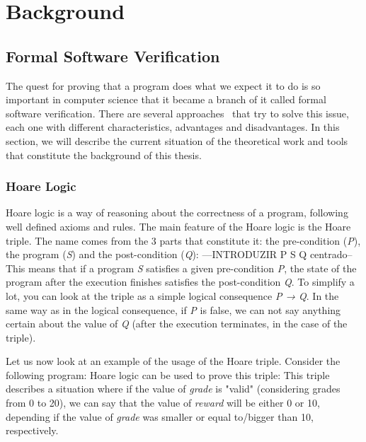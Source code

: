 
%

\chapter{Background}
\label{cha:background}

\glsresetall


\section{Formal Software Verification}
\label{sec:formal_software_verification}

The quest for proving that a program does what we expect it to do is so important in computer science that it became a branch of it called formal software verification. 
There are several approaches~\cite{DBLP:conf/fm/BrainP24} that try to solve this issue, each one with different characteristics, advantages and disadvantages. 
In this section, we will describe the current situation of the theoretical work and tools that constitute the background of this thesis.


\subsection{Hoare Logic} 
\label{sub:hoare_logic}

Hoare logic is a way of reasoning about the correctness of a program, following well defined axioms and rules.
The main feature of the Hoare logic is the Hoare triple. 
The name comes from the 3 parts that constitute it: the pre-condition (\emph{P}), the program (\emph{S}) and the post-condition (\emph{Q}):
---INTRODUZIR {P} S {Q} centrado--
This means that if a program \emph{S} satisfies a given pre-condition \emph{P}, the state of the program after the execution finishes satisfies the post-condition \emph{Q}.
To simplify a lot, you can look at the triple as a simple logical consequence \emph{P → Q}.
In the same way as in the logical consequence, if \emph{P} is false, we can not say anything certain about the value of \emph{Q} (after the execution terminates, in the case of the triple).

Let us now look at an example of the usage of the Hoare triple. Consider the following program:
Hoare logic can be used to prove this triple:
This triple describes a situation where if the value of \emph{grade} is "valid" (considering grades from 0 to 20), we can say that the value of \emph{reward} will be either 0 or 10, depending if the value of \emph{grade} was smaller or equal to/bigger than 10, respectively.


